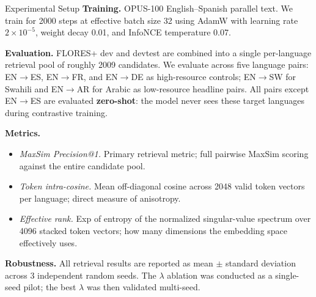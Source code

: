 \documentclass[20pt]{extarticle}
\begin{document}
\begin{minipage}[t]{0.315\linewidth}
\begin{sectionbox}{Experimental Setup}
\textbf{Training.} OPUS-100 English--Spanish parallel text. We train for 2000 steps at effective batch size 32 using AdamW with learning rate $2\times 10^{-5}$, weight decay 0.01, and InfoNCE temperature 0.07.

\textbf{Evaluation.} FLORES+ dev and devtest are combined into a single per-language retrieval pool of roughly 2009 candidates. We evaluate across five language pairs: EN$\to$ES, EN$\to$FR, and EN$\to$DE as high-resource controls; EN$\to$SW for Swahili and EN$\to$AR for Arabic as low-resource headline pairs. All pairs except EN$\to$ES are evaluated \textbf{zero-shot}: the model never sees these target languages during contrastive training.

\textbf{Metrics.}
\begin{itemize}[leftmargin=22pt, itemsep=4pt, topsep=4pt]
\item \emph{MaxSim Precision@1.} Primary retrieval metric; full pairwise MaxSim scoring against the entire candidate pool.
\item \emph{Token intra-cosine.} Mean off-diagonal cosine across 2048 valid token vectors per language; direct measure of anisotropy.
\item \emph{Effective rank.} Exp of entropy of the normalized singular-value spectrum over 4096 stacked token vectors; how many dimensions the embedding space effectively uses.
\end{itemize}

\textbf{Robustness.} All retrieval results are reported as mean $\pm$ standard deviation across 3 independent random seeds. The $\lambda$ ablation was conducted as a single-seed pilot; the best $\lambda$ was then validated multi-seed.
\end{sectionbox}

\end{minipage}%
\hfill
\end{document}
